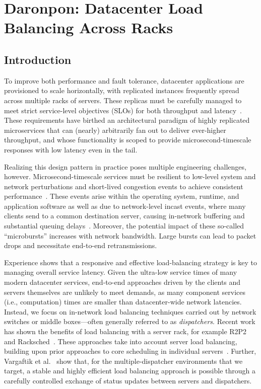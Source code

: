 \chapter{Daronpon: Datacenter Load Balancing Across Racks}
\label{daronpon:chap}


\section{Introduction}
\label{daronpon:sec:intro}

To improve both performance and fault tolerance, datacenter
applications are provisioned to scale horizontally, with replicated
instances frequently spread across multiple racks of servers.  These
replicas must be carefully managed to meet strict service-level
objectives (SLOs) for both throughput and
latency~\cite{killer_microseconds,tail_at_scale}. These requirements
have birthed an architectural paradigm of highly replicated
microservices that can (nearly) arbitrarily fan out to deliver
ever-higher throughput, and whose functionality is scoped to provide
microsecond-timescale responses with low latency even in the tail.

Realizing this design pattern in practice poses multiple engineering
challenges, however.  Microsecond-timescale services must be resilient
to low-level system and network perturbations and short-lived
congestion events to achieve consistent
performance~\cite{facebook_microburst}.  These events arise within the
operating system, runtime, and application software as well as due to
network-level incast events, where many clients send to a
common destination server, causing in-network buffering and
substantial queuing delays~\cite{facebook_memcache}.  Moreover, the
potential impact of these so-called ``microbursts'' increases with
network bandwidth.  Large bursts can lead to packet drops and
necessitate end-to-end retransmissions.

Experience shows that a responsive and effective load-balancing
strategy is key to managing overall service latency.  Given the
ultra-low service times of many modern datacenter services, end-to-end
approaches driven by the clients and servers themselves are unlikely
to meet demands, as many component services (i.e., computation) times
are smaller than datacenter-wide network latencies. Instead, we focus
on in-network load balancing techniques carried out by network
switches or middle boxes---often generally referred to as
\textit{dispatchers}.  Recent work has shown the benefits of load balancing
with a server rack, for example R2P2~\cite{r2p2} and
Racksched~\cite{racksched}.  These approaches take into account server
load balancing, building upon prior approaches to core scheduling in
individual servers~\cite{IX,shinjuku,shenango,seda}. Further,
Vargaftik et al.~\cite{lsq} show that, for the multiple-dispatcher
environments that we target, a stable and highly efficient load
balancing approach is possible through a carefully controlled exchange
of status updates between servers and dispatchers.

